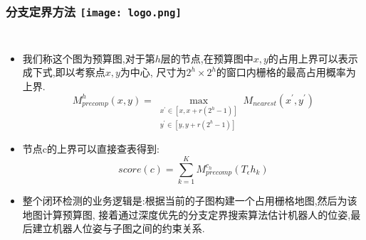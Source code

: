 \begin{comment}
\end{comment}
\begin{frame}
\frametitle{分支定界方法 \hfill \texttt{[image: logo.png]}}
\begin{columns}
	\begin{itemize}
		\item 我们称这个图为预算图,对于第$h$层的节点,在预算图中$x,y$的占用上界可以表示成下式,即以考察点$x,y$为中心,
		尺寸为$2^h \times 2^h$的窗口内栅格的最高占用概率为上界.
		\begin{equation}
			M_{precomp}^h(x,y) = \mathop{max}\limits_{
			\begin{matrix}
			x^\prime \in [x, x+r(2^h-1)]\\
			y^\prime \in [y, y+r(2^h-1)] 
			\end{matrix}}
			M_{nearest}(x^\prime, y^\prime)
		\end{equation}
		\vspace{0.2cm}
		\item 节点c的上界可以直接查表得到:
		\begin{equation}
			score(c) = \sum_{k=1}^K M_{precomp}^{c_h}(T_\epsilon h_k)
		\end{equation}
		\vspace{0.2cm}
		\item 整个闭环检测的业务逻辑是:根据当前的子图构建一个占用栅格地图,然后为该地图计算预算图,
		接着通过深度优先的分支定界搜索算法估计机器人的位姿,最后建立机器人位姿与子图之间的约束关系.
	\end{itemize}

\end{columns}
\end{frame}


